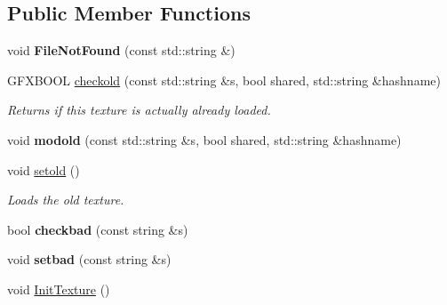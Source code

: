 \subsection*{Public Member Functions}
\begin{DoxyCompactItemize}
\item 
void {\bfseries File\+Not\+Found} (const std\+::string \&)\hypertarget{classTexture_a3b498b3b776cec2c43776f747edcbc08}{}\label{classTexture_a3b498b3b776cec2c43776f747edcbc08}

\item 
G\+F\+X\+B\+O\+OL \hyperlink{classTexture_ac99df9f719e9a2827996b0b103de567c}{checkold} (const std\+::string \&s, bool shared, std\+::string \&hashname)\hypertarget{classTexture_ac99df9f719e9a2827996b0b103de567c}{}\label{classTexture_ac99df9f719e9a2827996b0b103de567c}

\begin{DoxyCompactList}\small\item\em Returns if this texture is actually already loaded. \end{DoxyCompactList}\item 
void {\bfseries modold} (const std\+::string \&s, bool shared, std\+::string \&hashname)\hypertarget{classTexture_a8c3995e4bfe9f63861927e69a5efc542}{}\label{classTexture_a8c3995e4bfe9f63861927e69a5efc542}

\item 
void \hyperlink{classTexture_afd58d306700b125c3b950e188c5d9ebf}{setold} ()\hypertarget{classTexture_afd58d306700b125c3b950e188c5d9ebf}{}\label{classTexture_afd58d306700b125c3b950e188c5d9ebf}

\begin{DoxyCompactList}\small\item\em Loads the old texture. \end{DoxyCompactList}\item 
bool {\bfseries checkbad} (const string \&s)\hypertarget{classTexture_aee814d208d5cc0cf33852f22b1c78293}{}\label{classTexture_aee814d208d5cc0cf33852f22b1c78293}

\item 
void {\bfseries setbad} (const string \&s)\hypertarget{classTexture_afb3ee7b2f78e50775209c9fbffec671d}{}\label{classTexture_afb3ee7b2f78e50775209c9fbffec671d}

\item 
void \hyperlink{classTexture_af5fe76ea4a6c966f825179f8401f71ef}{Init\+Texture} ()\hypertarget{classTexture_af5fe76ea4a6c966f825179f8401f71ef}{}\label{classTexture_af5fe76ea4a6c966f825179f8401f71ef}


\end{DoxyCompactItemize}
